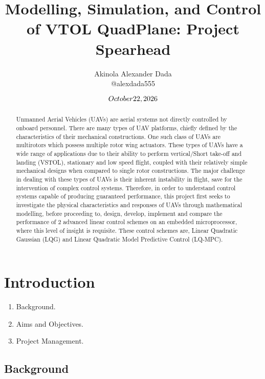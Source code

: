 \documentclass[12pt,a4paper,twoside]{report}
\title{ Modelling, Simulation, and Control of VTOL QuadPlane: Project Spearhead}
\author{Akinola Alexander Dada \\ @alexdada555}
\date{$\today$}
\begin{document}
	\begin{abstract}
		Unmanned Aerial Vehicles (UAVs) are aerial systems not directly controlled by onboard personnel. There are many types of UAV platforms, chiefly defined by the characteristics of their mechanical constructions. One such class of UAVs are multirotors which possess multiple rotor wing actuators. These types of UAVs have a wide range of applications due to their ability to perform vertical/Short take-off and landing (VSTOL), stationary and low speed flight, coupled with their relatively simple mechanical designs when compared to single rotor constructions. The major challenge in dealing with these types of UAVs is their inherent instability in flight, save for the intervention of complex control systems. Therefore, in order to understand control systems capable of producing guaranteed performance, this project first seeks to investigate the physical characteristics and responses of UAVs through mathematical modelling, before proceeding to, design, develop, implement and compare the performance of 2 advanced linear control schemes on an embedded microprocessor, where this level of insight is requisite. These control schemes are, Linear Quadratic Gaussian (LQG) and Linear Quadratic Model Predictive Control (LQ-MPC). 
	\end{abstract}
	\newpage
	
	\tableofcontents
	
	\newpage
	
	\listoffigures
	
	\newpage
	
	\listoftables
	
	\newpage
	
	
	\chapter{Introduction}
		
		\begin{enumerate}
			\item
				Background.
			\item 
				Aims and Objectives. 
			\item 
				Project Management.
		\end{enumerate}

		\section{Background}
		
\end{document}
